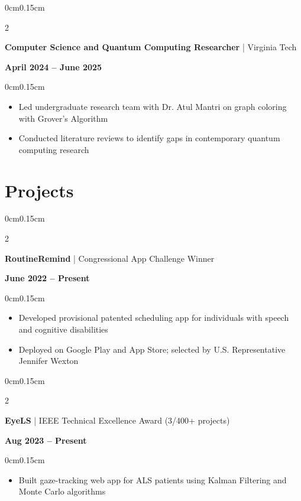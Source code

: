 \documentclass[10pt, letterpaper]{article}
\newenvironment{highlights}{
    \begin{itemize}[topsep=0pt, parsep=0pt, partopsep=0pt, itemsep=0pt, leftmargin=0.4cm]
}{
    \end{itemize}
}
\newenvironment{onecolentry}{
    \begin{adjustwidth}{0cm}{0.15cm}
}{
    \end{adjustwidth}
}
\newenvironment{twocolentry}[2][]{
    \onecolentry
    \def\secondColumn{#2}
    \setcolumnwidth{\fill, 4cm}
    \begin{paracol}{2}
}{
    \switchcolumn \raggedleft \secondColumn
    \end{paracol}
    \endonecolentry
}
\begin{document}
    \begin{twocolentry}{\textbf{April 2024 -- June 2025}}
        \textbf{Computer Science and Quantum Computing Researcher} | Virginia Tech
    \end{twocolentry}

    \vspace{0.05cm}
    \begin{onecolentry}
        \begin{highlights}
            \item Led undergraduate research team with Dr. Atul Mantri on graph coloring with Grover's Algorithm
            \item Conducted literature reviews to identify gaps in contemporary quantum computing research
        \end{highlights}
    \end{onecolentry}

    \section{Projects}
    \vspace{0.05cm}

    \begin{twocolentry}{\textbf{June 2022 -- Present}}
        \textbf{RoutineRemind} | Congressional App Challenge Winner
    \end{twocolentry}

    \vspace{0.05cm}
    \begin{onecolentry}
        \begin{highlights}
            \item Developed provisional patented scheduling app for individuals with speech and cognitive disabilities
            \item Deployed on Google Play and App Store; selected by U.S. Representative Jennifer Wexton
        \end{highlights}
    \end{onecolentry}

    \vspace{0.1cm}

    \begin{twocolentry}{\textbf{Aug 2023 -- Present}}
        \textbf{EyeLS} | IEEE Technical Excellence Award (3/400+ projects)
    \end{twocolentry}

    \vspace{0.05cm}
    \begin{onecolentry}
        \begin{highlights}
            \item Built gaze-tracking web app for ALS patients using Kalman Filtering and Monte Carlo algorithms
        \end{highlights}
    \end{onecolentry}
\end{document}
